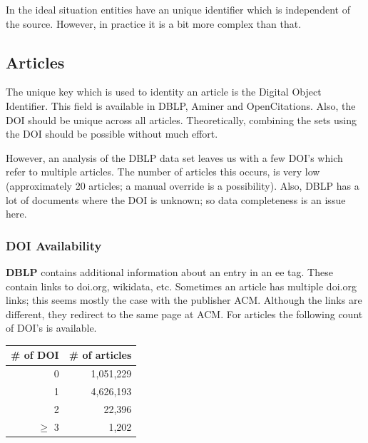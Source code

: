 \documentclass{ou-report}
\newcommand{\doi}{{DOI}}
\begin{document}

In the ideal situation entities have an unique identifier which is 
independent of the source. However, in practice it is a bit more complex than 
that.

\subsection{Articles}
The unique key which is used to identity an article is the Digital Object 
Identifier. This field is available in DBLP, Aminer and OpenCitations. Also, the
\doi{} should be unique across all articles. 
Theoretically, combining the sets using the DOI should be possible without much
effort.

However, an analysis of the DBLP data set leaves us with a few DOI's which refer
to multiple articles. The number of articles this occurs, is very low
(approximately 20 articles; a manual override is a possibility). Also, DBLP 
has a lot of documents where the DOI is unknown; so data completeness 
is an issue here. 

\subsubsection{DOI Availability}
\label{subsec:data_doi_availability}
\textbf{DBLP} contains additional information about an entry in an ee tag. These contain 
links to doi.org, wikidata, etc. Sometimes an article has multiple doi.org links; 
this seems mostly the case with the publisher ACM. Although the links are 
different, they redirect to the same page at ACM.
For articles the following count of DOI's is available.
\begin{center}
    \begin{tabular}{ rr }
        \toprule
        \# of DOI & \# of articles \\
        \midrule
        0 & 1,051,229 \\
        1 & 4,626,193 \\
        2 & 22,396 \\
        $\geq$ 3 & 1,202 \\
        \bottomrule
    \end{tabular}
\end{center}
\end{document}
